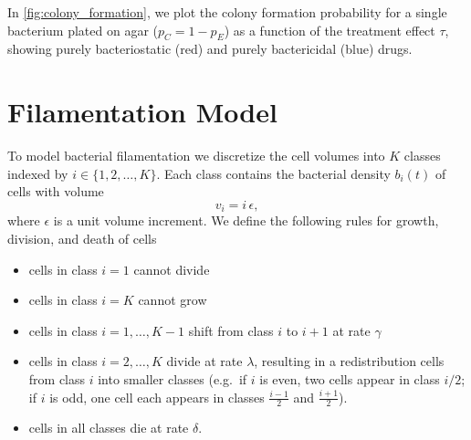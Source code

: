 In \autoref{fig:colony_formation}, we plot the colony formation probability for a single bacterium plated on agar (\(p_C = 1 - p_E\)) as a function of the treatment effect \(\tau\), showing purely bacteriostatic (red) and purely bactericidal (blue) drugs.


\section{Filamentation Model}\label{sec:model}
To model bacterial filamentation we discretize the cell volumes
into \(K\) classes indexed by \(i \in \{1, 2, \dots, K\}\).
Each class contains the bacterial density \(b_i(t)\) of cells with volume
\begin{equation}
  v_i = i\,\epsilon,
\end{equation}
where \(\epsilon\) is a unit volume increment. We define the following rules for growth, division, and death of cells
\begin{itemize}
  \item cells in class \(i=1\) cannot divide
  \item cells in class \(i=K\) cannot grow
  \item cells in class \(i=1,\ldots,K-1\) shift from class \(i\) to \(i+1\) at rate \(\gamma\)
  \item cells in class \(i=2,\ldots,K\) divide at rate \(\lambda\), resulting in a redistribution cells from class \(i\)
    into smaller classes (e.g.\ if \(i\) is even, two cells appear in class \(i/2\);
      if \(i\) is odd, one cell each appears in classes
    \(\tfrac{i-1}{2}\) and \(\tfrac{i+1}{2}\)).
  \item cells in all classes die at rate \(\delta\).
\end{itemize}

